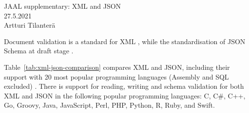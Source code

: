 \documentclass[11pt,a4paper]{article}
\author{Artturi Tilanterä}
\begin{document}

\begin{titlepage}
\centering
\Large{JAAL supplementary: XML and JSON} \\
\vspace{5 mm}
27.5.2021\\
Artturi Tilanterä
\end{titlepage}

Document validation is a standard for XML \cite{W3C2012}, while the
standardisation of JSON Schema at draft stage \cite{jsonschema-specification}.

Table~\ref{tab:xml-json-comparison} compares XML and JSON, including their
support with 20 most popular programming languages (Assembly and SQL excluded) \cite{tiobe2021}.
There is support for reading, writing and schema validation for both XML and
JSON in the following popular programming languages: C, C\#, C++, Go, Groovy,
Java, JavaScript, Perl, PHP, Python, R, Ruby, and Swift.
\end{document}
